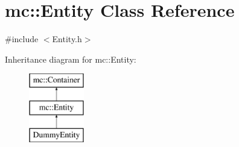 \hypertarget{classmc_1_1_entity}{}\section{mc\+:\+:Entity Class Reference}
\label{classmc_1_1_entity}


{\ttfamily \#include $<$Entity.\+h$>$}

Inheritance diagram for mc\+:\+:Entity\+:\begin{figure}[H]
\begin{center}
\leavevmode
\includegraphics[height=3.000000cm]{classmc_1_1_entity}
\end{center}
\end{figure}
